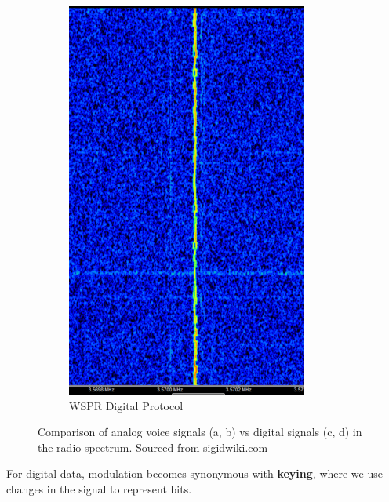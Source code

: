 \begin{figure}[h]
\begin{subfigure}[b]{0.2\textwidth}
        \includegraphics[width=\textwidth]{assets/osi/physical/signals/wspr.png}
        \caption{WSPR Digital Protocol}
        \label{fig:wspr_digital}
    \end{subfigure}
    
    \caption{Comparison of analog voice signals (a, b) vs digital signals (c, d) in the radio spectrum. Sourced from sigidwiki.com}
    \label{fig:analog_vs_digital_signals}
\end{figure}

\newpage
For digital data, modulation becomes synonymous with \textbf{keying}, where we use changes in the signal to represent bits.

